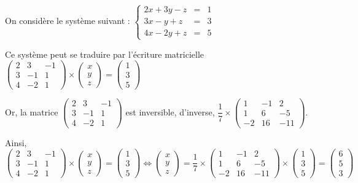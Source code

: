 \documentclass[11pt,fleqn]{book} %
\begin{document}
\begin{example}On considère le système suivant : $\left\{\begin{array}{rcl}2x +3y -z &=& 1 \\ 3x-y+z&=& 3 \\ 4x-2y+z &=&5 \end{array}\right.$

Ce système peut se traduire par l'écriture matricielle $\begin{pmatrix}2 & 3 & -1 \\ 3 & -1 & 1 \\ 4 & -2 & 1\end{pmatrix} \times \begin{pmatrix} x \\ y \\z\end{pmatrix} = \begin{pmatrix}
1 \\ 3 \\ 5
\end{pmatrix}$

Or, la matrice $\begin{pmatrix}2 & 3 & -1 \\ 3 & -1 & 1 \\ 4 & -2 & 1\end{pmatrix}$ est inversible, d'inverse, $\dfrac{1}{7} \times \begin{pmatrix} 1 & -1 & 2 \\ 1 & 6 & -5 \\ -2 & 16 & -11\end{pmatrix}$.

Ainsi, $\begin{pmatrix}2 & 3 & -1 \\ 3 & -1 & 1 \\ 4 & -2 & 1\end{pmatrix} \times \begin{pmatrix} x \\ y \\z\end{pmatrix} = \begin{pmatrix}
1 \\ 3 \\ 5
\end{pmatrix} \Leftrightarrow \begin{pmatrix} x \\ y \\z\end{pmatrix} = \dfrac{1}{7} \times \begin{pmatrix} 1 & -1 & 2 \\ 1 & 6 & -5 \\ -2 & 16 & -11\end{pmatrix} \times \begin{pmatrix}
1 \\ 3 \\ 5
\end{pmatrix} = \begin{pmatrix}
6 \\5 \\3
\end{pmatrix}$

\end{example}
\end{document}
